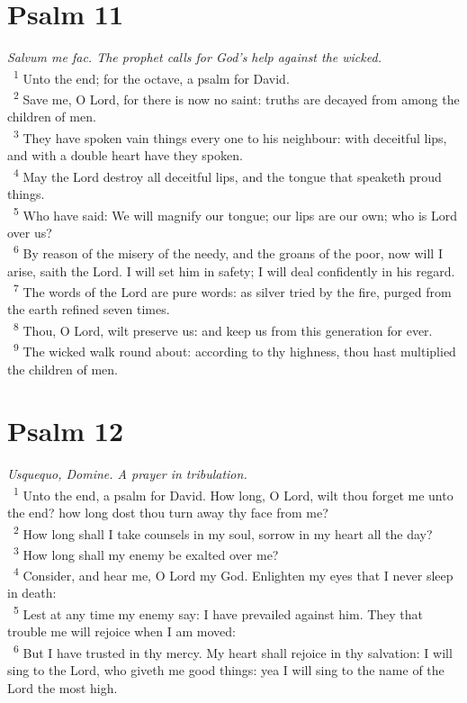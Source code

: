 \documentclass[a5paper,12pt]{article}
\begin{document}
\begin{multicols*}{2}
\section{Psalm 11}
\label{sec:orgc12c6b1}
\emph{Salvum me fac. The prophet calls for God's help against the wicked.}\\

~\textsuperscript{1} Unto the end; for the octave, a psalm for David.\\
~\textsuperscript{2} Save me, O Lord, for there is now no saint: truths are decayed from among the children of men.\\
~\textsuperscript{3} They have spoken vain things every one to his neighbour: with deceitful lips, and with a double heart have they spoken.\\
~\textsuperscript{4} May the Lord destroy all deceitful lips, and the tongue that speaketh proud things.\\
~\textsuperscript{5} Who have said: We will magnify our tongue; our lips are our own; who is Lord over us?\\
~\textsuperscript{6} By reason of the misery of the needy, and the groans of the poor, now will I arise, saith the Lord. I will set him in safety; I will deal confidently in his regard.\\
~\textsuperscript{7} The words of the Lord are pure words: as silver tried by the fire, purged from the earth refined seven times.\\
~\textsuperscript{8} Thou, O Lord, wilt preserve us: and keep us from this generation for ever.\\
~\textsuperscript{9} The wicked walk round about: according to thy highness, thou hast multiplied the children of men.\\

\section{Psalm 12}
\label{sec:org60791c4}
\emph{Usquequo, Domine. A prayer in tribulation.}\\

~\textsuperscript{1} Unto the end, a psalm for David. How long, O Lord, wilt thou forget me unto the end? how long dost thou turn away thy face from me?\\
~\textsuperscript{2} How long shall I take counsels in my soul, sorrow in my heart all the day?\\
~\textsuperscript{3} How long shall my enemy be exalted over me?\\
~\textsuperscript{4} Consider, and hear me, O Lord my God. Enlighten my eyes that I never sleep in death:\\
~\textsuperscript{5} Lest at any time my enemy say: I have prevailed against him. They that trouble me will rejoice when I am moved:\\
~\textsuperscript{6} But I have trusted in thy mercy. My heart shall rejoice in thy salvation: I will sing to the Lord, who giveth me good things: yea I will sing to the name of the Lord the most high.\\


\end{multicols*}
\end{document}
